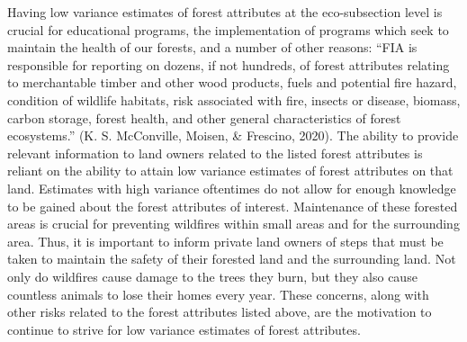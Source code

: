 \documentclass[12pt,twoside]{reedthesis}
\begin{document}
Having low variance estimates of forest attributes at the eco-subsection level is crucial for educational programs, the implementation of programs which seek to maintain the health of our forests, and a number of other reasons: ``FIA is responsible for reporting on dozens, if not hundreds, of forest attributes relating to merchantable timber and other wood products, fuels and potential fire hazard, condition of wildlife habitats, risk associated with fire, insects or disease, biomass, carbon storage, forest health, and other general characteristics of forest ecosystems.'' (K. S. McConville, Moisen, \& Frescino, 2020). The ability to provide relevant information to land owners related to the listed forest attributes is reliant on the ability to attain low variance estimates of forest attributes on that land. Estimates with high variance oftentimes do not allow for enough knowledge to be gained about the forest attributes of interest. Maintenance of these forested areas is crucial for preventing wildfires within small areas and for the surrounding area. Thus, it is important to inform private land owners of steps that must be taken to maintain the safety of their forested land and the surrounding land. Not only do wildfires cause damage to the trees they burn, but they also cause countless animals to lose their homes every year. These concerns, along with other risks related to the forest attributes listed above, are the motivation to continue to strive for low variance estimates of forest attributes.
\end{document}
